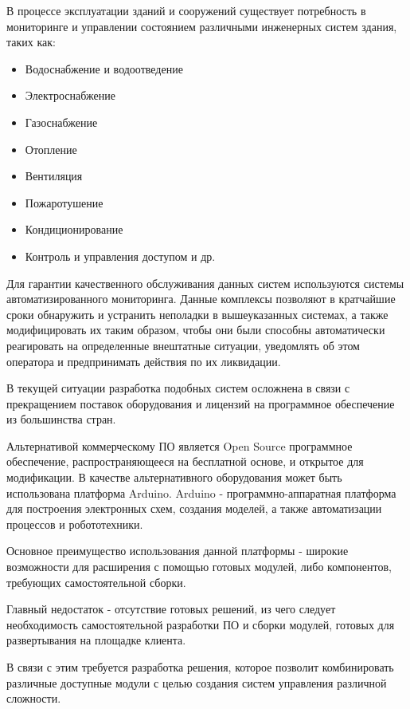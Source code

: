 \newpage
{}
В процессе эксплуатации зданий и сооружений существует потребность в мониторинге и управлении состоянием различными инженерных систем здания, таких как:

\begin{itemize}
	\itemsep0em 
	\item Водоснабжение и водоотведение
	\item Электроснабжение
	\item Газоснабжение
	\item Отопление
	\item Вентиляция
	\item Пожаротушение
	\item Кондиционирование
	\item Контроль и управления доступом и др.
\end{itemize}

Для гарантии качественного обслуживания данных систем используются системы автоматизированного мониторинга. Данные комплексы позволяют в кратчайшие сроки обнаружить и устранить неполадки в вышеуказанных системах, а также модифицировать их таким образом, чтобы они были способны автоматически реагировать на определенные внештатные ситуации, уведомлять об этом оператора и предпринимать действия по их ликвидации.

В текущей ситуации разработка подобных систем осложнена в связи с прекращением поставок оборудования и лицензий на программное обеспечение из большинства стран.

Альтернативой коммерческому ПО является Open Source программное обеспечение, распространяющееся на бесплатной основе, и открытое для модификации.
В качестве альтернативного оборудования может быть использована платформа Arduino.
Arduino - программно-аппаратная платформа для построения электронных схем, создания моделей, а также автоматизации процессов и робототехники.

Основное преимущество использования данной платформы - широкие возможности для расширения с помощью готовых модулей, либо компонентов, требующих самостоятельной сборки.

Главный недостаток - отсутствие готовых решений, из чего следует необходимость самостоятельной разработки ПО и сборки модулей, готовых для развертывания на площадке клиента.

В связи с этим требуется разработка решения, которое позволит комбинировать различные доступные модули с целью создания систем управления различной сложности.


